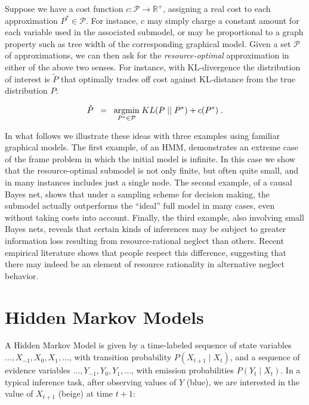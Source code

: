\documentclass[10pt,letterpaper]{article}
\newcommand{\red}[1]{\textcolor{Red}{#1}}
\begin{document}
Suppose we have a cost function $c: \mathcal{P}\rightarrow\mathbb{R}^+$, assigning a real cost to each approximation $P^* \in \mathcal{P}$. For instance, $c$ may simply charge a constant amount for each variable used in the associated submodel, or may be proportional to a graph property such as tree width of the corresponding graphical model. Given a set $\mathcal{P}$ of approximations, we can then ask for the \emph{resource-optimal} approximation  in either of the above two senses. For instance, with KL-divergence the distribution of interest is $\tilde{P}$ that optimally trades off cost against KL-distance from the true distribution $P$: 

\begin{equation} \tilde{P} \;\;= \;\; \underset{P^*\in\mathcal{P}}{\textnormal{argmin}} \; KL(P\;||\;P^*) + c(P^*)\;.\label{optimal}\end{equation}


In what follows we illustrate these ideas with three examples using familiar graphical models. The first example, of an HMM, demonstrates an extreme case of the frame problem in which the initial model is infinite. In this case we show that the resource-optimal submodel is not only finite, but often quite small, and in many instances includes just a single node. The second example, of a causal Bayes net, shows that under a sampling scheme for decision making, the submodel actually outperforms the ``ideal'' full model in many cases, even without taking costs into account. Finally, the third example, also involving small Bayes nets, reveals that certain kinds of inferences may be subject to greater information loss resulting from resource-rational neglect than others. Recent empirical literature shows that people respect this difference, suggesting that there may indeed be an element of resource rationality in alternative neglect behavior.

\section{Hidden Markov Models}

A Hidden Markov Model is given by a time-labeled sequence of state variables $\dots,X_{-1},X_{0},X_1,\dots$, %
with transition probability $P(X_{t+1}\mid X_t)$, and a sequence of evidence variables $\dots,Y_{-1},Y_0,Y_1,\dots$, with emission probabilities $P(Y_t\mid X_t)$. In a typical inference task, after observing  values of $Y$ (blue), we are interested in the value of $X_{t+1}$ (beige) at time $t+1$:
\end{document}
